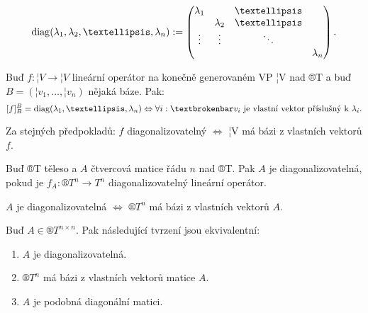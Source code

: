 \documentclass[12pt]{article}                   %
\begin{document}
    \begin{poznamka}[Značení]
        $$ \diag(\lambda_1, \lambda_2, …, \lambda_n) := \begin{pmatrix} \lambda_1 & & … & \\ & \lambda_2 & … & \\ \vdots & \vdots & \ddots & \\ & & & \lambda_n \end{pmatrix}. $$
    \end{poznamka}

    \begin{tvrzeni}
        Buď $f: ¦V \rightarrow ¦V$ lineární operátor na konečně generovaném VP ¦V nad ®T a buď $B = (¦v_1, …, ¦v_n)$ nějaká báze. Pak:
        $$ [f]_B^B = \diag(\lambda_1, …, \lambda_n) \Leftrightarrow \forall i: ¦v_i \text{ je vlastní vektor příslušný k } \lambda_i. $$ 
    \end{tvrzeni}

    \begin{dusledek}
        Za stejných předpokladů: $f$ diagonalizovatelný $\Leftrightarrow$ ¦V má bázi z vlastních vektorů $f$.
    \end{dusledek}

    \begin{definice}
        Buď ®T těleso a $A$ čtvercová matice řádu $n$ nad ®T. Pak $A$ je diagonalizovatelná, pokud je $f_A: ®T^n \rightarrow T^n$ diagonalizovatelný lineární operátor.
    \end{definice}

    \begin{dusledek}
        $A$ je diagonalizovatelná $\Leftrightarrow$ $®T^n$ má bázi z vlastních vektorů $A$.
    \end{dusledek}

    \begin{tvrzeni}
        Buď $A \in ®T^{n \times n}$. Pak následující tvrzení jsou ekvivalentní:
        
        \begin{enumerate}
            \item $A$ je diagonalizovatelná.
            \item $®T^n$ má bázi z vlastních vektorů matice $A$.
            \item $A$ je podobná diagonální matici.
        \end{enumerate}
    \end{tvrzeni}
\end{document}
